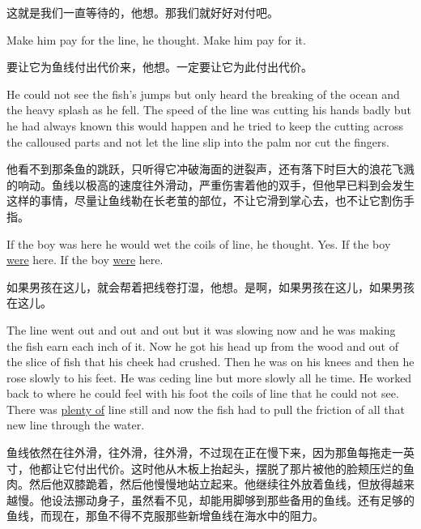 \begin{paracol}{2}
这就是我们一直等待的，他想。那我们就好好对付吧。

\switchcolumn*

Make him pay for the line, he thought. Make him pay for it.

\switchcolumn

要让它为鱼线付出代价来，他想。一定要让它为此付出代价。

\switchcolumn*

He could not see the fish's jumps but only heard the breaking of the ocean
and the heavy \gls{splash} as he fell. The speed of the line was cutting his
hands badly but he had always known this would happen and he tried to keep
the cutting across the \gls{calloused} parts and not let the line slip into
the \gls{palm} nor cut the fingers.

\switchcolumn

他看不到那条鱼的跳跃，只听得它冲破海面的迸裂声，还有落下时巨大的浪花飞溅的响动。鱼线以极高的速度往外滑动，严重伤害着他的双手，但他早已料到会发生这样的事情，尽量让鱼线勒在长老茧的部位，不让它滑到掌心去，也不让它割伤手指。

\switchcolumn*

If the boy was here he would wet the coils of line, he thought. Yes. If the
boy \uline{were} here. If the boy \uline{were} here.

\switchcolumn

如果男孩在这儿，就会帮着把线卷打湿，他想。是啊，如果男孩在这儿，如果男孩在这儿。

\switchcolumn*

The line went out and out and out but it was slowing now and he was making
the fish earn each inch of it. Now he got his head up from the wood and out
of the slice of fish that his cheek had \gls{crushed}. Then he was on his
knees and then he rose slowly to his feet. He was \gls{ceding} line but more
slowly all he time. He worked back to where he could feel with his foot the
coils of line that he could not see. There was \uline{plenty of} line still and now
the fish had to pull the \gls{friction} of all that new line through the water.

\switchcolumn

鱼线依然在往外滑，往外滑，往外滑，不过现在正在慢下来，因为那鱼每拖走一英寸，他都让它付出代价。这时他从木板上抬起头，摆脱了那片被他的脸颊压烂的鱼肉。然后他双膝跪着，然后他慢慢地站立起来。他继续往外放着鱼线，但放得越来越慢。他设法挪动身子，虽然看不见，却能用脚够到那些备用的鱼线。还有足够的鱼线，而现在，那鱼不得不克服那些新增鱼线在海水中的阻力。


\end{paracol}
